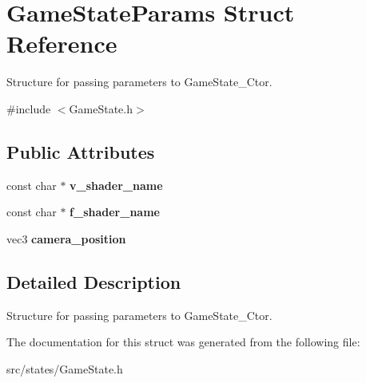 \hypertarget{struct_game_state_params}{}\section{Game\+State\+Params Struct Reference}
\label{struct_game_state_params}


Structure for passing parameters to Game\+State\+\_\+\+Ctor.  




{\ttfamily \#include $<$Game\+State.\+h$>$}

\subsection*{Public Attributes}
\begin{DoxyCompactItemize}
\item 
\mbox{\label{struct_game_state_params_a2dc1fef30341fc92fe81a487b1e3fb86}} 
const char $\ast$ {\bfseries v\+\_\+shader\+\_\+name}
\item 
\mbox{\label{struct_game_state_params_aac0544fd854569e78ee057a220f10655}} 
const char $\ast$ {\bfseries f\+\_\+shader\+\_\+name}
\item 
\mbox{\label{struct_game_state_params_addce986ed1913c9d5b1881b00329f466}} 
vec3 {\bfseries camera\+\_\+position}
\end{DoxyCompactItemize}


\subsection{Detailed Description}
Structure for passing parameters to Game\+State\+\_\+\+Ctor. 

The documentation for this struct was generated from the following file\+:\begin{DoxyCompactItemize}
\item 
src/states/Game\+State.\+h\end{DoxyCompactItemize}
